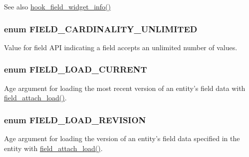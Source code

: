 \begin{DoxySeeAlso}{See also}
\hyperlink{group__field__widget_gac53aa6c2a4ac1215660d25b5d7f20792}{hook\_\-field\_\-widget\_\-info()} 
\end{DoxySeeAlso}
\hypertarget{group__field_gac14c9ab18aca82aebcbc6cfa511964fc}{
\subsubsection[{FIELD\_\-CARDINALITY\_\-UNLIMITED}]{\setlength{\rightskip}{0pt plus 5cm}enum {\bf FIELD\_\-CARDINALITY\_\-UNLIMITED}}}
\label{group__field_gac14c9ab18aca82aebcbc6cfa511964fc}
Value for field API indicating a field accepts an unlimited number of values. \hypertarget{group__field_ga39b9fb0d47b181607a4d981a9bccbe8a}{
\subsubsection[{FIELD\_\-LOAD\_\-CURRENT}]{\setlength{\rightskip}{0pt plus 5cm}enum {\bf FIELD\_\-LOAD\_\-CURRENT}}}
\label{group__field_ga39b9fb0d47b181607a4d981a9bccbe8a}
Age argument for loading the most recent version of an entity's field data with \hyperlink{group__field__attach_ga1e92543395961c912eb293b50e991586}{field\_\-attach\_\-load()}. \hypertarget{group__field_ga6eae4d17256be446f837da1a360f0096}{
\subsubsection[{FIELD\_\-LOAD\_\-REVISION}]{\setlength{\rightskip}{0pt plus 5cm}enum {\bf FIELD\_\-LOAD\_\-REVISION}}}
\label{group__field_ga6eae4d17256be446f837da1a360f0096}
Age argument for loading the version of an entity's field data specified in the entity with \hyperlink{group__field__attach_ga1e92543395961c912eb293b50e991586}{field\_\-attach\_\-load()}. 

